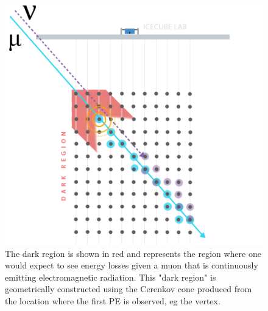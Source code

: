 \documentclass{PoS}
\begin{document}
\begin{figure}[h!]
\centering 
    \includegraphics[width=0.85\linewidth]{VetoGraphic_V2_AtmoNu.png}
    \caption{The dark region is shown in red and represents the region where one would expect to see energy losses given a muon that is continuously emitting electromagnetic radiation. This "dark region" is geometrically constructed using the Cerenkov cone produced from the location where the first PE is observed, eg the vertex. }
\label{fig:STV}
\end{figure}
\end{document}
